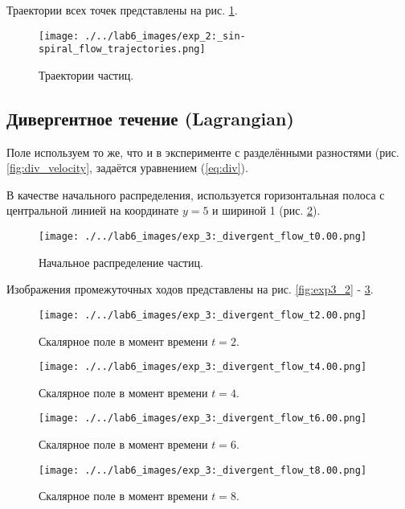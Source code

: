 Траектории всех точек представлены на рис. \ref{fig:lg_shaer_tr}.

\begin{figure}[H]
	\centering
	\texttt{[image: ./../lab6\_images/exp\_2:\_sin-spiral\_flow\_trajectories.png]}
	\caption{Траектории частиц.}
	\label{fig:lg_shaer_tr}
\end{figure}

\newpage
\subsection{Дивергентное течение (Lagrangian)}
Поле используем то же, что и в эксперименте с разделёнными разностями (рис. \ref{fig:div_velocity},  задаётся уравнением (\ref{eq:div}).

В качестве начального распределения, используется горизонтальная полоса с центральной линией на координате $y=5$ и шириной 1 (рис. \ref{fig:lg_div_begin}). 
\begin{figure}
	\centering
	\texttt{[image: ./../lab6\_images/exp\_3:\_divergent\_flow\_t0.00.png]}
	\caption{Начальное распределение частиц.}
	\label{fig:lg_div_begin}
\end{figure}

Изображения промежуточных ходов представлены на рис. \ref{fig:exp3_2} - \ref{fig:exp3_8}.

\begin{figure}
	\centering
	\begin{minipage}[b]{0.48\textwidth}
		\centering
		\texttt{[image: ./../lab6\_images/exp\_3:\_divergent\_flow\_t2.00.png]}
		\caption{Скалярное поле в момент времени $t=2$.}
		\label{fig:exp3_2}
	\end{minipage}
	\hfill
	\begin{minipage}[b]{0.48\textwidth}
		\centering
		\texttt{[image: ./../lab6\_images/exp\_3:\_divergent\_flow\_t4.00.png]}
		\caption{Скалярное поле в момент времени $t=4$.}
	\end{minipage}
	\vspace{0.5cm}
	
	\begin{minipage}[b]{0.48\textwidth}
		\centering
		\texttt{[image: ./../lab6\_images/exp\_3:\_divergent\_flow\_t6.00.png]}
		\caption{Скалярное поле в момент времени $t=6$.}
	\end{minipage}
	\hfill
	\begin{minipage}[b]{0.48\textwidth}
		\centering
		\texttt{[image: ./../lab6\_images/exp\_3:\_divergent\_flow\_t8.00.png]}
		\caption{Скалярное поле в момент времени $t=8$.}
				\label{fig:exp3_8}
	\end{minipage}
\end{figure}

